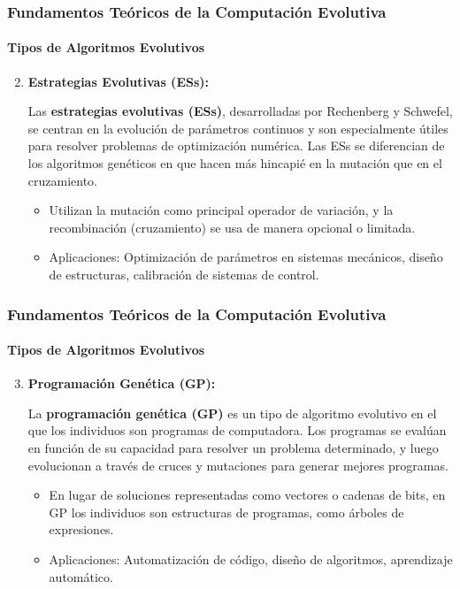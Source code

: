 \documentclass[
	11pt, %
]{beamer}
\begin{document}
\begin{frame}
    \frametitle{Fundamentos Teóricos de la Computación Evolutiva}
    \framesubtitle{Tipos de Algoritmos Evolutivos}
    \begin{enumerate}
    \setcounter{enumi}{1}
        \item \textbf{Estrategias Evolutivas (ESs):}
        
        Las \textbf{estrategias evolutivas (ESs)}, desarrolladas por Rechenberg y Schwefel, se centran en la evolución de parámetros continuos y son especialmente útiles para resolver problemas de optimización numérica. Las ESs se diferencian de los algoritmos genéticos en que hacen más hincapié en la mutación que en el cruzamiento.
        
        \begin{itemize}
            \item Utilizan la mutación como principal operador de variación, y la recombinación (cruzamiento) se usa de manera opcional o limitada.
            \item Aplicaciones: Optimización de parámetros en sistemas mecánicos, diseño de estructuras, calibración de sistemas de control.
        \end{itemize}
    \end{enumerate}
\end{frame}

\begin{frame}
    \frametitle{Fundamentos Teóricos de la Computación Evolutiva}
    \framesubtitle{Tipos de Algoritmos Evolutivos}
    \begin{enumerate}
    \setcounter{enumi}{2}
        \item \textbf{Programación Genética (GP):}
        
        La \textbf{programación genética (GP)} es un tipo de algoritmo evolutivo en el que los individuos son programas de computadora. Los programas se evalúan en función de su capacidad para resolver un problema determinado, y luego evolucionan a través de cruces y mutaciones para generar mejores programas.
        
        \begin{itemize}
            \item En lugar de soluciones representadas como vectores o cadenas de bits, en GP los individuos son estructuras de programas, como árboles de expresiones.
            \item Aplicaciones: Automatización de código, diseño de algoritmos, aprendizaje automático.
        \end{itemize}
    \end{enumerate}
\end{frame}
\end{document}
